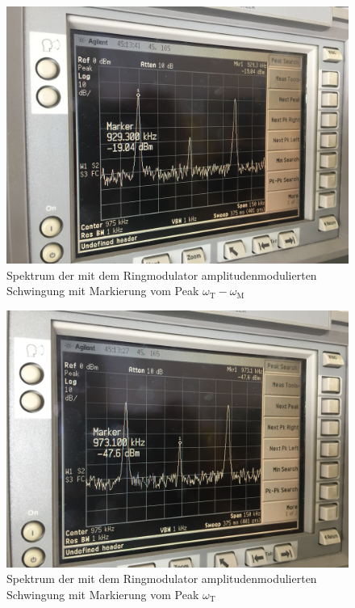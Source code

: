 \begin{figure}[H]
  \includegraphics[width=\textwidth]{Spektrum_Pics/b1.jpg}
  \caption{Spektrum der mit dem Ringmodulator amplitudenmodulierten Schwingung mit Markierung vom Peak $\omega_\text{T} - \omega_\text{M}$}
  \label{fig:b1}
\end{figure}
\begin{figure}[H]
  \includegraphics[width=\textwidth]{Spektrum_Pics/b2.jpg}
  \caption{Spektrum der mit dem Ringmodulator amplitudenmodulierten Schwingung mit Markierung vom Peak $\omega_\text{T}$}
  \label{fig:b2}
\end{figure}
